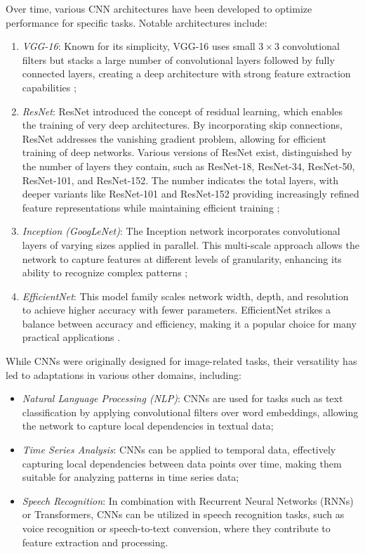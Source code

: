 Over time, various CNN architectures have been developed to optimize performance for specific tasks. Notable architectures include:
\begin{enumerate}
    \item \textit{VGG-16}: Known for its simplicity, VGG-16 uses small \(3 \times 3\) convolutional filters but stacks a large number of convolutional layers followed by fully connected layers, creating a deep architecture with strong feature extraction capabilities \cite{7486599};

    \item \textit{ResNet}: ResNet introduced the concept of residual learning, which enables the training of very deep architectures. By incorporating skip connections, ResNet addresses the vanishing gradient problem, allowing for efficient training of deep networks. Various versions of ResNet exist, distinguished by the number of layers they contain, such as ResNet-18, ResNet-34, ResNet-50, ResNet-101, and ResNet-152. The number indicates the total layers, with deeper variants like ResNet-101 and ResNet-152 providing increasingly refined feature representations while maintaining efficient training \cite{DBLP:journals/corr/HeZRS15, 10197463};

    \item \textit{Inception (GoogLeNet)}: The Inception network incorporates convolutional layers of varying sizes applied in parallel. This multi-scale approach allows the network to capture features at different levels of granularity, enhancing its ability to recognize complex patterns \cite{DBLP:journals/corr/SzegedyLJSRAEVR14};

    \item \textit{EfficientNet}: This model family scales network width, depth, and resolution to achieve higher accuracy with fewer parameters. EfficientNet strikes a balance between accuracy and efficiency, making it a popular choice for many practical applications \cite{DBLP:journals/corr/abs-1905-11946}.
\end{enumerate}

While CNNs were originally designed for image-related tasks, their versatility has led to adaptations in various other domains, including:
\begin{itemize}
    \item \textit{Natural Language Processing (NLP)}: CNNs are used for tasks such as text classification by applying convolutional filters over word embeddings, allowing the network to capture local dependencies in textual data;

    \item \textit{Time Series Analysis}: CNNs can be applied to temporal data, effectively capturing local dependencies between data points over time, making them suitable for analyzing patterns in time series data;

    \item \textit{Speech Recognition}: In combination with Recurrent Neural Networks (RNNs) or Transformers, CNNs can be utilized in speech recognition tasks, such as voice recognition or speech-to-text conversion, where they contribute to feature extraction and processing.
\end{itemize}

